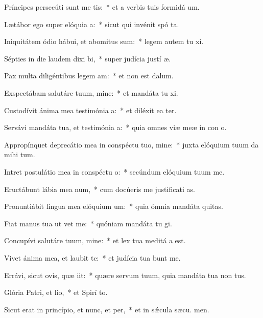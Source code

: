 \item Príncipes persecúti sunt me tis:~* et a verbis tuis formidá  um.
\item Lætábor ego super elóquia a:~* sicut qui invénit spó ta.
\item Iniquitátem ódio hábui, et abomitus sum:~* legem autem tu xi.
\item Sépties in die laudem dixi bi,~* super judícia justí æ.
\item Pax multa diligéntibus legem am:~* et non est  dalum.
\item Exspectábam salutáre tuum, mine:~* et mandáta tu xi.
\item Custodívit ánima mea testimónia a:~* et diléxit ea ter.
\item Servávi mandáta tua, et testimónia a:~* quia omnes viæ meæ in con o.
\item Appropínquet deprecátio mea in conspéctu tuo, mine:~* juxta elóquium tuum da mihi tum.
\item Intret postulátio mea in conspéctu o:~* secúndum elóquium tuum  me.
\item Eructábunt lábia mea num,~* cum docúeris me justificati as.
\item Pronuntiábit lingua mea elóquium um:~* quia ómnia mandáta  quitas.
\item Fiat manus tua ut vet me:~* quóniam mandáta tu gi.
\item Concupívi salutáre tuum, mine:~* et lex tua meditá a est.
\item Vivet ánima mea, et laubit te:~* et judícia tua bunt me.
\item Errávi, sicut ovis, quæ iit:~* quære servum tuum, quia mandáta tua non  tus.
\item Glória Patri, et lio,~* et Spirí to.
\item Sicut erat in princípio, et nunc, et per,~* et in sǽcula sæcu. men.
